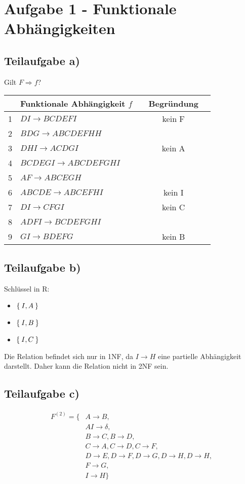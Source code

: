 \documentclass[a4paper,9pt]{scrartcl}
\newcommand{\cmark}{\ding{51}}%
\newcommand{\xmark}{\ding{55}}%
\begin{document}
\section{Aufgabe 1 - Funktionale Abhängigkeiten}
\subsection{Teilaufgabe a)}
  Gilt $F \Rightarrow f$?

  \begin{tabular}{clccl}
    & Funktionale Abhängigkeit $f$ &  & Begründung\\
    \hline\hline
    1 & $DI \rightarrow BCDEFI$         & \xmark &   kein F\\
    2 & $BDG \rightarrow ABCDEFHH$      & \cmark &\\
    3 & $DHI \rightarrow ACDGI$         & \xmark &   kein A\\
    4 & $BCDEGI \rightarrow ABCDEFGHI$  & \cmark &\\
    5 & $AF \rightarrow ABCEGH$         & \cmark &\\
    6 & $ABCDE \rightarrow ABCEFHI$     & \xmark &   kein I\\
    7 & $DI \rightarrow CFGI$           & \xmark &   kein C\\
    8 & $ADFI \rightarrow BCDEFGHI$     & \cmark &\\
    9 & $GI \rightarrow BDEFG$          & \xmark &   kein B\\
  \end{tabular}

\subsection{Teilaufgabe b)}
Schlüssel in R:
\begin{itemize}
    \item $\Set{I, A}$
    \item $\Set{I, B}$
    \item $\Set{I, C}$
\end{itemize}

Die Relation befindet sich nur in 1NF, da $I \rightarrow H$ eine
partielle Abhängigkeit darstellt. Daher kann die Relation nicht in
2NF sein.

\subsection{Teilaufgabe c)}
\begin{align*}
F^{(2)} = \{  & A \rightarrow B,\\
    &AI \rightarrow \delta,\\
    & B \rightarrow C, B \rightarrow D,\\
    & C \rightarrow A,C \rightarrow D,C \rightarrow F,\\
    & D \rightarrow E,D \rightarrow F,D \rightarrow G,D \rightarrow H,D \rightarrow H,\\
    & F \rightarrow G,\\
    & I \rightarrow H
\}
\end{align*}
\end{document}
